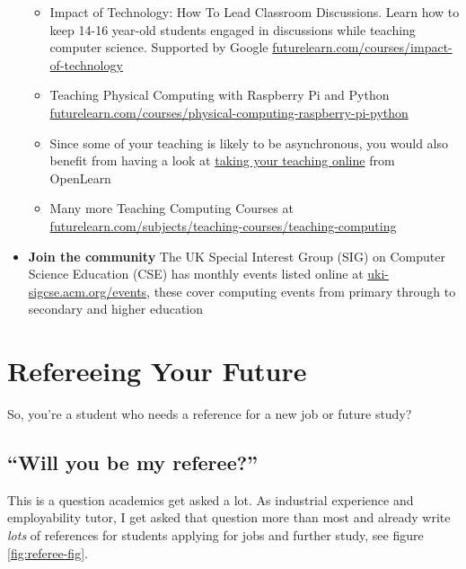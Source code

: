 \documentclass[
  12pt,
]{book}
\providecommand{\tightlist}{%
  \setlength{\itemsep}{0pt}\setlength{\parskip}{0pt}}
\begin{document}
\begin{itemize}
  \begin{itemize}
  \tightlist
  \item
    Impact of Technology: How To Lead Classroom Discussions. Learn how to keep 14-16 year-old students engaged in discussions while teaching computer science. Supported by Google \href{https://www.futurelearn.com/courses/impact-of-technology}{futurelearn.com/courses/impact-of-technology}
  \item
    Teaching Physical Computing with Raspberry Pi and Python \href{https://www.futurelearn.com/courses/physical-computing-raspberry-pi-python}{futurelearn.com/courses/physical-computing-raspberry-pi-python}
  \item
    Since some of your teaching is likely to be asynchronous, you would also benefit from having a look at \href{https://www.open.edu/openlearn/education-development/education/take-your-teaching-online/content-section-overview}{taking your teaching online} from OpenLearn
  \item
    Many more Teaching Computing Courses at \href{https://www.futurelearn.com/subjects/teaching-courses/teaching-computing}{futurelearn.com/subjects/teaching-courses/teaching-computing}
  \end{itemize}
\item
  \textbf{Join the community} The UK Special Interest Group (SIG) on Computer Science Education (CSE) has monthly events listed online at \href{https://uki-sigcse.acm.org/events}{uki-sigcse.acm.org/events}, these cover computing events from primary through to secondary and higher education
\end{itemize}

\hypertarget{referee}{%
\chapter{Refereeing Your Future}\label{referee}}

So, you're a student who needs a reference for a new job or future study?

\hypertarget{willyou}{%
\section{``Will you be my referee?''}\label{willyou}}

This is a question academics get asked a lot. As industrial experience and employability tutor, I get asked that question more than most and already write \emph{lots} of references for students applying for jobs and further study, see figure \ref{fig:referee-fig}.
\end{document}
